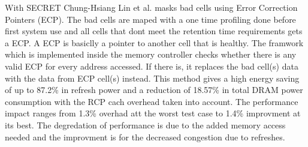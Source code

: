 With SECRET Chung-Hsiang Lin et al. \cite{secret} masks bad cells using Error Correction Pointers (ECP). The bad cells are maped with a one time profiling done before first system use and all cells that dont meet the retention time requirements gets a ECP. A ECP is basiclly a pointer to another cell that is healthy. The framwork which is implemented inside the memory controller checks whether there is any valid ECP for every address accessed. If there is, it replaces the bad cell(s) data with the data from ECP cell(s) instead.
This method gives a high energy saving of up to 87.2\% in refresh power and a reduction of 18.57\% in total DRAM power consumption with the RCP cach overhead taken into account.
The performance impact ranges from 1.3\% overhad att the worst test case to 1.4\% improvment at its best. The degredation of performance is due to the added memory access needed and the improvment is for the decreased congestion due to refreshes.

